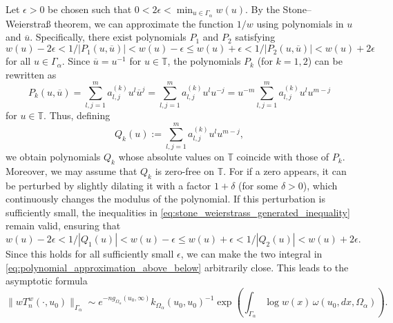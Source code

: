 \documentclass[12pt,oneside,reqno]{amsart}
\theoremstyle{definition}
\numberwithin{equation}{section}
\newcommand{\T}{{\mathbb T}}
\renewcommand{\Cap}{\operatorname{Cap}}
\begin{document}
Let $\epsilon>0$ be chosen such that $0<2\epsilon<\min_{u\in \Gamma_\alpha} w(u)$. By the Stone--Weierstra{\ss} theorem, we can approximate the function $1/w$ using polynomials in $u$ and $\overline{u}$. 
Specifically, there exist polynomials $P_1$ and $P_2$ satisfying
\begin{equation}
	w(u)-2\epsilon < 1/|P_{1}(u,\overline{u})|< w(u)-\epsilon\leq w(u)+\epsilon < 1/|P_2(u,\overline{u})|< w(u)+2\epsilon
	\label{eq:stone_weierstrass_generated_inequality}
\end{equation}
for all $u\in \Gamma_\alpha$. 
Since $\overline{u} = u^{-1}$ for $u\in \T$, the polynomials $P_k$ (for $k=1, 2$) can be rewritten as 
\[P_k(u,\overline{u}) = \sum_{l,j=1}^{m}a_{l,j}^{(k)}u^l\overline{u}^j = \sum_{l,j = 1}^{m}a_{l,j}^{(k)}u^lu^{-j} = u^{-m}\sum_{l,j=1}^{m}a_{l,j}^{(k)}u^{l}u^{m-j}\]
for $u\in \T$.
Thus, defining
\[
	Q_{k}(u) := \sum_{l,j=1}^{m}a_{l,j}^{(k)}u^{l}u^{m-j},
\]
we obtain polynomials $Q_k$ whose absolute values on $\T$ coincide with those of $P_k$. 
Moreover, we may assume that $Q_k$ is zero-free on $\T$. For if a zero appears, it can be perturbed by slightly dilating it with a factor $1+\delta$ (for some $\delta>0$), which continuously changes the modulus of the polynomial. If this perturbation is sufficiently small, the inequalities in \eqref{eq:stone_weierstrass_generated_inequality} remain valid, ensuring that
\begin{equation}
	w(u)-2\epsilon < 1/|Q_1(u)|< w(u)-\epsilon\leq w(u)+\epsilon < 1/|Q_2(u)|< w(u)+2\epsilon.
\end{equation}
Since this holds for all sufficiently small $\epsilon$, we can make the two integral in \eqref{eq:polynomial_approximation_above_below} arbitrarily close. 
This leads to the asymptotic formula
\begin{equation}
	\|w T_n^{w}(\cdot,u_0)\|_{\Gamma_\alpha}\sim  e^{-ng_{\Omega_\alpha}(u_0,\infty)}k_{\Omega_\alpha}(u_0,u_0)^{-1}\exp\left(\int_{\Gamma_\alpha} \log w(x)\,\omega(u_0,dx,\Omega_{\alpha})\right).
	\label{eq:limit_chebyshev_norm}
\end{equation}
\end{document}
